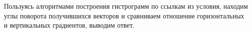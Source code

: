 \solutionSection

Пользуясь алгоритмами построения гистрограмм по ссылкам из условия, находим углы поворота получившихся векторов и сравниваем отношение горизонтальных и вертикальных градиентов, выводим ответ.

\codeExample

